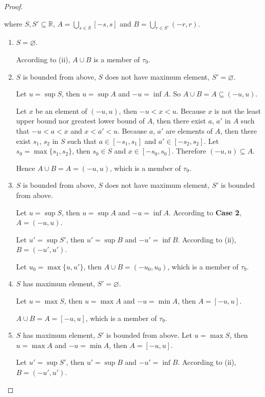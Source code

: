 \begin{proof}
\begin{enumerate}[label={(\roman*)}]
		      where $S, S'\subseteq\mathbb{R}$, $A =  \bigcup_{s\in S} [-s, s]$ and $B =  \bigcup_{r\in S'} (-r, r)$.
		      \begin{enumerate}[label={\textbf{Case \arabic*.}},itemindent=1cm]
			      \item $S = \varnothing$.

			            According to (ii), $A\cup B$ is a member of $\tau_{9}$.
			      \item $S$ is bounded from above, $S$ does not have maximum element, $S' = \varnothing$.

			            Let $u = \sup S$, then $u = \sup A$ and $-u = \inf A$. So $A\cup B = A\subseteq (-u, u)$.

			            Let $x$ be an element of $(-u, u)$, then $-u < x < u$. Because $x$ is not the least upper bound nor greatest lower bound of $A$, then there exist $a$, $a'$ in $A$ such that $-u < a < x$ and $x < a' < u$. Because $a$, $a'$ are elements of $A$, then there exist $s_{1}$, $s_{2}$ in $S$ such that $a\in [-s_{1}, s_{1}]$ and $a'\in [-s_{2}, s_{2}]$. Let $s_{0} = \max\{ s_{1}, s_{2} \}$, then $s_{0}\in S$ and $x\in [-s_{0}, s_{0}]$. Therefore $(-u, u)\subseteq A$.

			            Hence $A\cup B = A = (-u, u)$, which is a member of $\tau_{9}$.
			      \item $S$ is bounded from above, $S$ does not have maximum element, $S'$ is bounded from above.

			            Let $u = \sup S$, then $u = \sup A$ and $-u = \inf A$. According to \textbf{Case 2}, $A = (-u, u)$.

			            Let $u' = \sup S'$, then $u' = \sup B$ and $-u' = \inf B$. According to (ii), $B = (-u', u')$.

			            Let $u_{0} = \max\{ u, u' \}$, then $A\cup B = (-u_{0}, u_{0})$, which is a member of $\tau_{9}$.
			      \item $S$ has maximum element, $S' = \varnothing$.

			            Let $u = \max S$, then $u = \max A$ and $-u = \min A$, then $A = [-u, u]$.

			            $A\cup B = A = [-u, u]$, which is a member of $\tau_{9}$.
			      \item $S$ has maximum element, $S'$ is bounded from above.
			            Let $u = \max S$, then $u = \max A$ and $-u = \min A$, then $A = [-u, u]$.

			            Let $u' = \sup S'$, then $u' = \sup B$ and $-u' = \inf B$. According to (ii), $B = (-u', u')$.


\end{enumerate}
\end{enumerate}
\end{proof}
